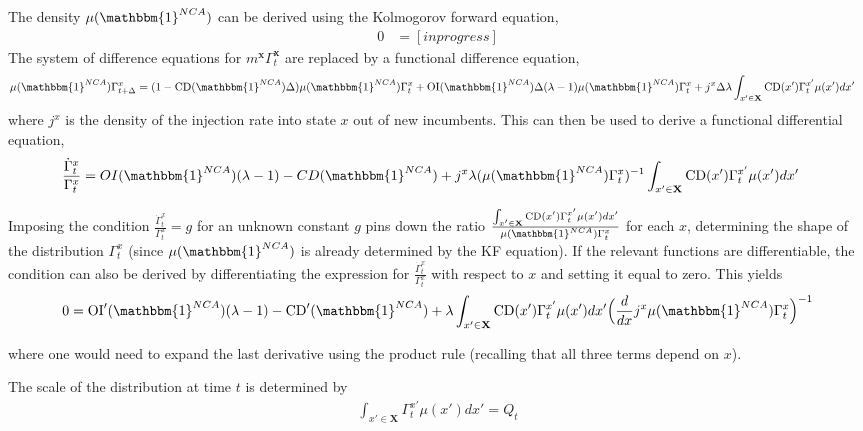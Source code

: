 \documentclass[11pt,english]{article}
\begin{document}
The density $\mu(\mathbbm{1}^{NCA})$ can be derived using the Kolmogorov forward equation,
\begin{align}
0 &= [in progress]
\end{align}
The system of difference equations for $m^{\textbf{x}} \Gamma_t^{\textbf{x}}$ are replaced by a functional difference equation, 
\begin{align}
\mu(\mathbbm{1}^{NCA}) \Gamma_{t+\Delta}^x &= (1- \text{CD}(\mathbbm{1}^{NCA}) \Delta) \mu(\mathbbm{1}^{NCA}) \Gamma_t^x + \text{OI}(\mathbbm{1}^{NCA}) \Delta (\lambda -1) \mu(\mathbbm{1}^{NCA}) \Gamma_t^x +  j^x \Delta  \lambda \int_{x' \in \mathbf{X}} \text{CD}(x') \Gamma_t^{x'} \mu(x') dx'
\end{align}
where $j^x$ is the density of the injection rate into state $x$ out of new incumbents. This can then be used to derive a functional differential equation,
\begin{align}
\frac{\dot{\Gamma}_{t}^x}{\Gamma_t^x} &= OI(\mathbbm{1}^{NCA}) (\lambda -1) - CD(\mathbbm{1}^{NCA}) + j^x \lambda (\mu(\mathbbm{1}^{NCA}) \Gamma_t^x)^{-1} \int_{x' \in \mathbf{X}} \text{CD}(x') \Gamma_t^{x'} \mu(x') dx'
\end{align}

Imposing the condition $\frac{\dot{\Gamma}_{t}^x}{\Gamma_t^x} = g$ for an unknown constant $g$ pins down the ratio $\frac{\int_{x' \in \mathbf{X}} \text{CD}(x') \Gamma_t^{x'} \mu(x') dx'}{\mu(\mathbbm{1}^{NCA}) \Gamma_t^x}$ for each $x$, determining the shape of the distribution $\Gamma_t^x$ (since $\mu(\mathbbm{1}^{NCA})$ is already determined by the KF equation). If the relevant functions are differentiable, the condition can also be derived by differentiating the expression for $\frac{\dot{\Gamma}_t^x}{\Gamma_t^x}$ with respect to $x$ and setting it equal to zero. This yields
\begin{align}
0 = \text{OI}'(\mathbbm{1}^{NCA}) (\lambda -1) - \text{CD}'(\mathbbm{1}^{NCA}) + \lambda \int_{x' \in \mathbf{X}} \text{CD}(x') \Gamma_t^{x'} \mu(x') dx' \Big(\frac{d}{dx} j^x \mu(\mathbbm{1}^{NCA}) \Gamma_t^x \Big)^{-1}
\end{align} 

where one would need to expand the last derivative using the product rule (recalling that all three terms depend on $x$). 

The scale of the distribution at time $t$ is determined by 
\begin{align}
\int_{x' \in \mathbf{X}} \Gamma_t^{x'} \mu(x') dx' = Q_t
\end{align}
\end{document}
